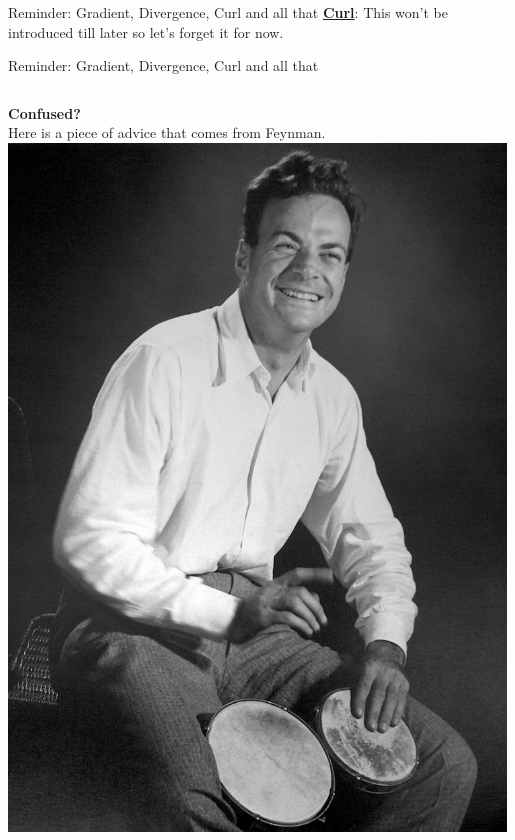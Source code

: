 {\begin{frame}{Reminder: Gradient, Divergence, Curl and all that}
\vspace{0.2cm}
\underline{\bf Curl}: This won't be introduced till later so let's forget it for now.

\end{frame}


%
%
%

\begin{frame}{Reminder: Gradient, Divergence, Curl and all that}

\begin{columns}
  \begin{column}{0.25\textwidth}
   \begin{center}
     {\bf Confused?}\\
     \vspace{0.3cm}
     {\small
      Here is a piece of advice that comes from Feynman.\\
     }
     \vspace{0.3cm}
     \includegraphics[width=0.99\textwidth]{./images/people/feynman_bongos2.jpg}\\

\end{center}
\end{column}
\end{columns}
\end{frame}}
